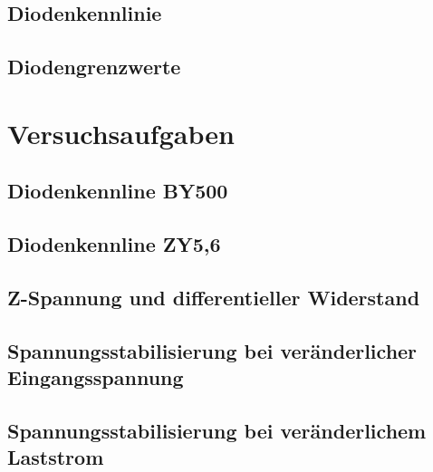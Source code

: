 \documentclass[a4paper, 12pt]{article}
\begin{document}
\subsection{Diodenkennlinie}

\subsection{Diodengrenzwerte}


\section{Versuchsaufgaben}

\subsection{Diodenkennline BY500}

\subsection{Diodenkennline ZY5,6}

\subsection{Z-Spannung und differentieller Widerstand}

\subsection{Spannungsstabilisierung bei veränderlicher Eingangsspannung}

\subsection{Spannungsstabilisierung bei veränderlichem Laststrom}
\end{document}
